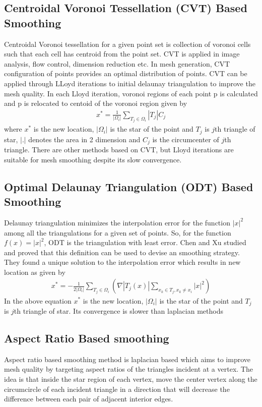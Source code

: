 \subsection{Centroidal Voronoi Tessellation (CVT) Based Smoothing}
Centroidal Voronoi tessellation \cite{cvt} for a given point set is collection of voronoi cells such that each cell has centroid from the point set. CVT is applied in image analysis, flow control, dimension reduction etc. In mesh generation, CVT configuration of points provides an optimal distribution of points. CVT can be applied through LLoyd \cite{lloyd} iterations to initial delaunay triangulation to improve the mesh quality. In each Lloyd iteration, voronoi regions of each point p is calculated and p is relocated to centoid of the voronoi region given by 
\begin{eqnarray}
x^*= \frac{1}{|\Omega_i|} \sum_{T_j \in \Omega_i} |T_j|C_j
\end{eqnarray}
where  $x^*$ is the new location, $|\Omega_i|$ is the star of the point and $T_j$ is $j$th triangle of star, $|.|$ denotes the area in 2 dimension and $C_j$ is the circumcenter of $j$th triangle. There are other methods based on CVT, but Lloyd iterations are suitable for mesh smoothing despite its slow convergence.

\subsection{Optimal Delaunay Triangulation (ODT) Based Smoothing}
Delaunay triangulation minimizes the interpolation error for the function $|x|^2$ among all the triangulations for a given set of points. So, for the function $f(x) = |x|^2$, ODT is the triangulation with least error. Chen and Xu \cite{chen&xu} studied and proved that this definition can be used to devise an smoothing strategy. They found a unique solution to the interpolation error which results in new location as given by
\begin{eqnarray}
x^*=-\frac{1}{2|\Omega_i|} \sum_{T_j \in \Omega_i}(\nabla |T_j(x)| \sum_{x_k \in T_j, x_k \neq x_i} |x|^2)
\end{eqnarray}
In the above equation $x^*$ is the new location, $|\Omega_i|$ is the star of the point and $T_j$ is $j$th triangle of star. Its convergence is slower than laplacian methods 

\subsection{Aspect Ratio Based smoothing}
Aspect ratio based smoothing \cite{arbased} method is laplacian based which aims to improve mesh quality by targeting aspect ratios of the triangles incident at a vertex. The idea is that inside the star region of each vertex, move the center vertex along the circumcircle of each incident triangle in a direction that will decrease the difference between each pair of adjacent interior edges.

